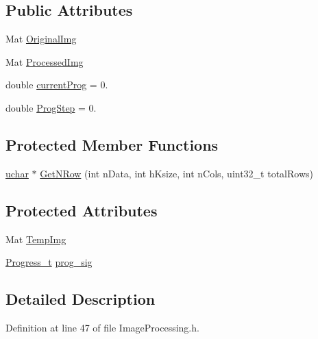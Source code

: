 \subsection*{Public Attributes}
\begin{DoxyCompactItemize}
\item 
Mat \hyperlink{class_vision_1_1_image_processing_a77c370dab270158a4e9c634e2d3f48e7}{Original\+Img}
\item 
Mat \hyperlink{class_vision_1_1_image_processing_aa7d65742882cd1b2a1e4e9cb68809211}{Processed\+Img}
\item 
double \hyperlink{class_vision_1_1_image_processing_ac06b3b9501cde8e742aaf99d986af256}{current\+Prog} = 0.
\item 
double \hyperlink{class_vision_1_1_image_processing_a7438451f9a447a33e9f04bf8e73eae31}{Prog\+Step} = 0.
\end{DoxyCompactItemize}
\subsection*{Protected Member Functions}
\begin{DoxyCompactItemize}
\item 
\hyperlink{_soil_math_types_8h_a65f85814a8290f9797005d3b28e7e5fc}{uchar} $\ast$ \hyperlink{class_vision_1_1_image_processing_a56e17515a15eb7d246985e550fc89610}{Get\+N\+Row} (int n\+Data, int h\+Ksize, int n\+Cols, uint32\+\_\+t total\+Rows)
\end{DoxyCompactItemize}
\subsection*{Protected Attributes}
\begin{DoxyCompactItemize}
\item 
Mat \hyperlink{class_vision_1_1_image_processing_a5371ad8d6f7aac9d43ee5c902ade7435}{Temp\+Img}
\item 
\hyperlink{class_vision_1_1_image_processing_ade0de8f6751f8d19b8fbb9533a009d3c}{Progress\+\_\+t} \hyperlink{class_vision_1_1_image_processing_ac0c168e16365ff5941791f67ec895663}{prog\+\_\+sig}
\end{DoxyCompactItemize}


\subsection{Detailed Description}


Definition at line 47 of file Image\+Processing.\+h.



